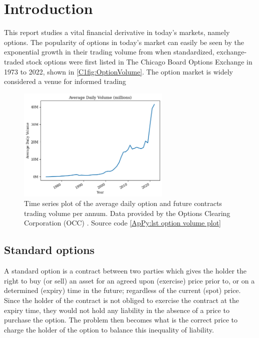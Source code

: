 \chapter{Introduction}

This report studies a vital financial derivative in today's markets, namely options. The popularity of options in today's market can easily be seen by the exponential growth in their trading volume from when standardized, exchange-traded stock options were first listed in The Chicago Board Options Exchange in 1973 \cite[p. 51-52]{markham2002financial} to 2022, shown in \autoref{C1fig:OptionVolume}. The option market is widely considered a venue for informed trading 

\begin{figure}[H]
    \centering
    \includegraphics[width=0.65\textwidth]{Chapters/C1/plots/OptionVolume.png}
    \caption{Time series plot of the average daily option and future contracts trading volume per annum. Data provided by the Options Clearing Corporation (OCC) \cite{THEOCC}. Source code \autoref{ApPy:lst option volume plot}}
    \label{C1fig:OptionVolume}
\end{figure}

\section{Standard options}

A standard option is a contract between two parties which gives the holder the right to buy (or sell) an asset for an agreed upon (exercise) price prior to, or on a determined (expiry) time in the future; regardless of the current (spot) price. Since the holder of the contract is not obliged to exercise the contract at the expiry time, they would not hold any liability in the absence of a price to purchase the option. The problem then becomes what is the correct price to charge the holder of the option to balance this inequality of liability. 

